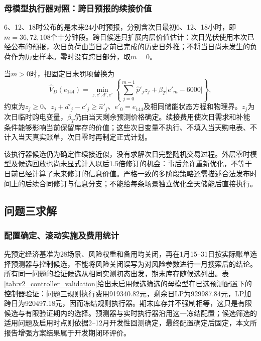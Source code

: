 \subsubsection{母模型执行器对照：跨日预报的续接价值}

6、12、18时公布的是未来24小时预报，分别含次日最初6、12、18小时，即$m=36,72,108$个十分钟段。跨日候选只扩展内层价值估计：次日光伏使用本次已经公布的预报，次日负荷由当日之前已完成的历史日外推；不将当日尚未发生的负荷作为历史样本。零时没有跨日部分，取$m=0$。

当$m>0$时，把固定日末罚项替换为
\begin{equation}
 \widehat V_D(e_{144})=\min_{z,c',d',e'}
 \left\{\sum_{j=0}^{m-1}\widehat p'_jz_j+\beta_T|e'_m-6000|\right\},
 \label{eq:v2_continuation}
\end{equation}
约束为$z_j\ge0$、$z_j+d'_j-c'_j\ge\widehat n'_j$、$e'_0=e_{144}$及相同储能状态方程和物理界。$z_j$为次日临时购电变量，$\beta_T$仍由当天剩余预测价格确定。续接费用使次日需求和补能条件能够影响当前保留库存的价值；这些次日变量不执行、不填入当天购电表、不计入当天真实账单，次日零时再制定正式计划。

该执行器候选仍为确定性续接近似，没有求解次日完整随机交易过程。外层零时模型及候选回放也尚未显式计入以后1.5倍修订的机会：事后允许重新优化，不等于日前已经计算了未来修订的信息价值。严格一致的多阶段策略还需描述合法发布时间上的后续合同修订与信息分支；不能给每条场景独立优化全天储能后直接执行。

\subsection{问题三求解}

\subsubsection{配置确定、滚动实施及费用统计}

先预定经济基准为28场景、风险权重和备用均关闭，再在1月15--31日按实际账单选择预测器与控制候选，不能将风险关闭误写为对风险参数进行一月搜索后的结论。所有同一问题的验证候选从相同实测初态出发，期末库存随候选列出。表\ref{tab:v2_controller_validation}给出未启用候选筛选的母模型在已选预测配置下的控制器验证：问题三规则执行费用919340.82元，剩余日LP为929987.84元，LP加跨日为920497.18元，因而冻结规则执行器。期末库存并不强制相等，这只是有限候选与有限验证期内的选择。预测器与实时执行器沿用这一冻结配置；候选筛选的适用问题及启用时点则依据2--12月开发性回测确定，最终配置确定后固定，本文所报告增强方案结果属于开发期闭环评价。


